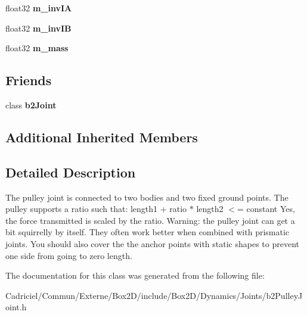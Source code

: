 \begin{DoxyCompactItemize}
\item 
float32 {\bfseries m\+\_\+inv\+IA}\hypertarget{classb2_pulley_joint_a701fbc685109f5b397b968be2407b123}{}\label{classb2_pulley_joint_a701fbc685109f5b397b968be2407b123}

\item 
float32 {\bfseries m\+\_\+inv\+IB}\hypertarget{classb2_pulley_joint_a19278e2f7dcec7275aff55b1d760b398}{}\label{classb2_pulley_joint_a19278e2f7dcec7275aff55b1d760b398}

\item 
float32 {\bfseries m\+\_\+mass}\hypertarget{classb2_pulley_joint_a60efdc42d9fd8f4c50f96eb68ff3f191}{}\label{classb2_pulley_joint_a60efdc42d9fd8f4c50f96eb68ff3f191}

\end{DoxyCompactItemize}
\subsection*{Friends}
\begin{DoxyCompactItemize}
\item 
class {\bfseries b2\+Joint}\hypertarget{classb2_pulley_joint_a54ade8ed3d794298108d7f4c4e4793fa}{}\label{classb2_pulley_joint_a54ade8ed3d794298108d7f4c4e4793fa}

\end{DoxyCompactItemize}
\subsection*{Additional Inherited Members}


\subsection{Detailed Description}
The pulley joint is connected to two bodies and two fixed ground points. The pulley supports a ratio such that\+: length1 + ratio $\ast$ length2 $<$= constant Yes, the force transmitted is scaled by the ratio. Warning\+: the pulley joint can get a bit squirrelly by itself. They often work better when combined with prismatic joints. You should also cover the the anchor points with static shapes to prevent one side from going to zero length. 

The documentation for this class was generated from the following file\+:\begin{DoxyCompactItemize}
\item 
Cadriciel/\+Commun/\+Externe/\+Box2\+D/include/\+Box2\+D/\+Dynamics/\+Joints/b2\+Pulley\+Joint.\+h\end{DoxyCompactItemize}
